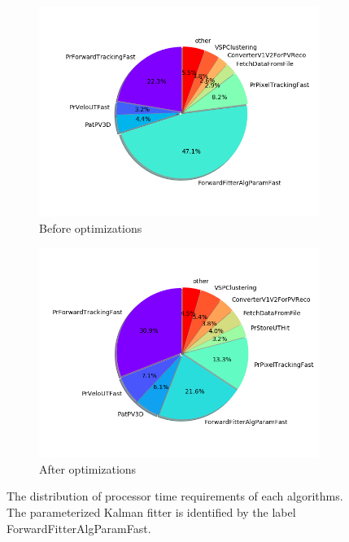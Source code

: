\documentclass[12pt]{article}
\begin{document}
\begin{figure}[H]
	\centering
	\begin{subfigure}{.5\textwidth}
		\centering
		\includegraphics[width=\linewidth]{algo_usage_original_bestphys}
		\caption{Before optimizations}
	\end{subfigure}%
	\begin{subfigure}{.5\textwidth}
		\centering
		\includegraphics[width=\linewidth]{algo_usage_optkalman_bestphys}
		\caption{After optimizations}
	\end{subfigure}
	\caption[CPU time share of algorithms after Kalman fitter optimizations]{The distribution of processor time requirements of each algorithms. The parameterized Kalman fitter is identified by the label ForwardFitterAlgParamFast.}
	\label{fig_kalmanfit_results_algousage}
\end{figure}
\end{document}
